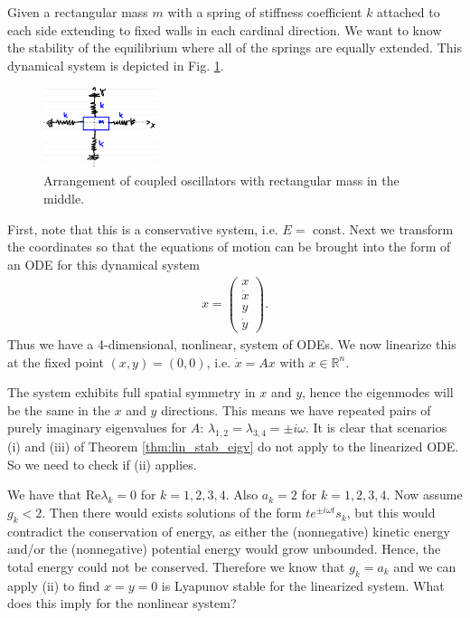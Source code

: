 \begin{ex}
	Given a rectangular mass $m$ with a spring of stiffness coefficient $k$ attached to each side extending to fixed walls in each cardinal direction. We want to know the stability of the equilibrium where all of the springs are equally extended. This dynamical system is depicted in Fig. \ref{fig:quad_spring}.
\begin{figure}[h!]
	\centering
	\includegraphics[width= 0.3\textwidth]{figures/ch2/11quad_spring.png}
\caption{Arrangement of coupled oscillators with rectangular mass in the middle.} \label{fig:quad_spring}
\end{figure}
First, note that this is a conservative system, i.e. $E=$ const. Next we transform the coordinates so that the equations of motion can be brought into the form of an ODE for this dynamical system
\begin{align}
	{x} = 
	\begin{pmatrix}
		x \\ \dot{x} \\ y  \\ \dot{y}
	\end{pmatrix}.
\end{align}
Thus we have a 4-dimensional, nonlinear, system of ODEs. We now linearize this at the fixed point $(x,y)= (0,0)$, i.e. $\dot{{x}} = {A} {x} $ with ${x} \in \mathbb{R}^{n}$.

The system exhibits full spatial symmetry in $x$ and $y$, hence the eigenmodes will be the same in the $x$ and $y$ directions. This means we have repeated pairs of purely imaginary eigenvalues for ${A} $:  $\lambda_{1,2}=\lambda_{3,4}= \pm i \omega $. It is clear that scenarios (i) and (iii) of Theorem \ref{thm:lin_stab_eigv} do not apply to the linearized ODE. So we need to check if (ii) applies.

We have that $ \textrm{Re} \lambda _{k}=0$ for $k=1,2,3,4$. Also $a_k=2$ for $k=1,2,3,4$. Now assume $g_k < 2$. Then there would exists solutions of the form $te^{\pm i \omega t}{s}_k$, but this would contradict the conservation of energy, as either the (nonnegative) kinetic energy and/or the (nonnegative) potential energy would grow unbounded. Hence, the total energy could not be conserved. Therefore we know that $g_k = a_k$ and we can apply (ii) to find $x=y=0$ is Lyapunov stable for the linearized system. What does this imply for the nonlinear system?
\end{ex}

